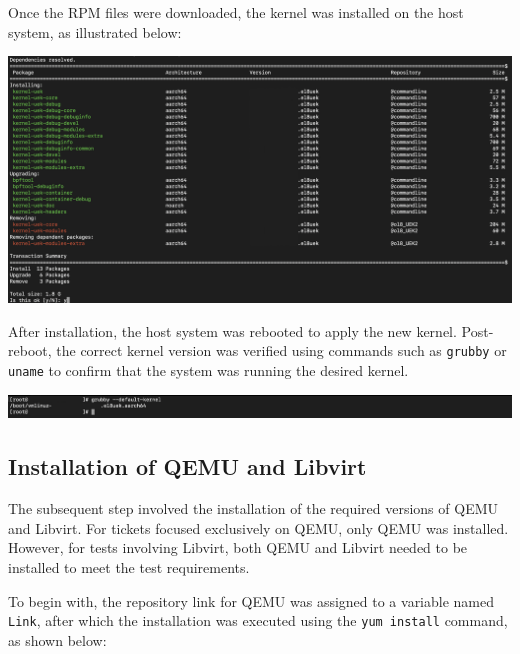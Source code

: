 Once the RPM files were downloaded, the kernel was installed on the host system, as illustrated below:

\begin{center}
    \centering
    \includegraphics[width=\textwidth]{Images/Kernel-Installation.png}
    \label{fig:casa}
\end{center}

After installation, the host system was rebooted to apply the new kernel. Post-reboot, the correct kernel version was verified using commands such as \texttt{grubby} or \texttt{uname} to confirm that the system was running the desired kernel.

\begin{center}
    \centering
    \includegraphics[width=\textwidth]{Images/Kernel-Version.png}
    \label{fig:casa}
\end{center}

\subsection{Installation of QEMU and Libvirt}

The subsequent step involved the installation of the required versions of QEMU and Libvirt. For tickets focused exclusively on QEMU, only QEMU was installed. However, for tests involving Libvirt, both QEMU and Libvirt needed to be installed to meet the test requirements.\mynewline

To begin with, the repository link for QEMU was assigned to a variable named \texttt{Link}, after which the installation was executed using the \texttt{yum install} command, as shown below:

